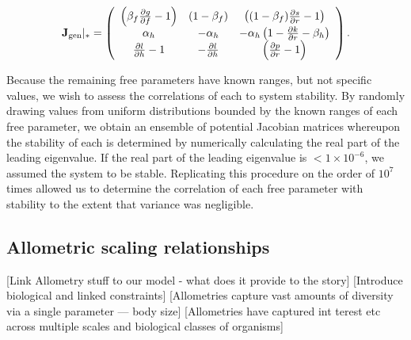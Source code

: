 \documentclass[12pt,english]{article}
\begin{document}
\begin{spacing}{1.9}
\begin{equation}
\mathbf{J}_{\rm gen}|_* =
\left(
\begin{array}{ccc}
 \left(\beta_f \frac{\partial g}{\partial f} - 1 \right) & (1-\beta_f) & \left( (1-\beta_f)\frac{\partial s}{\partial r} - 1 \right) \\
 \alpha_h & -\alpha_h & -\alpha_h \left(1-\frac{\partial k}{\partial r} - \beta_h  \right) \\
 \frac{\partial l}{\partial h}-1 & -\frac{\partial l}{\partial h} &  \left( \frac{\partial p}{\partial r} - 1 \right) \\
\end{array}
\right).
\label{eq_Jacgen}
\end{equation}

Because the remaining free parameters have known ranges, but not specific values, we wish to assess the correlations of each to system stability.
By randomly drawing values from uniform distributions bounded by the known ranges of each free parameter, we obtain an ensemble of potential Jacobian matrices whereupon the stability of each is determined by numerically calculating the real part of the leading eigenvalue.
If the real part of the leading eigenvalue is $<1\times10^{-6}$, we assumed the system to be stable.
Replicating this procedure on the order of $10^7$ times allowed us to determine the correlation of each free parameter with stability to the extent that variance was negligible.



\subsection{Allometric scaling relationships}

[Link Allometry stuff to our model - what does it provide to the story]
[Introduce biological and linked constraints]
[Allometries capture vast amounts of diversity via a single parameter --- body size]
[Allometries have captured int terest etc across multiple scales and biological classes of organisms]



\end{spacing}
\end{document}
